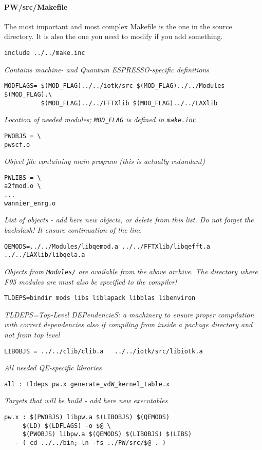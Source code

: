 \documentclass[12pt,a4paper]{article}
\def\qe{{\sc Quantum ESPRESSO}}
\begin{document}
\paragraph{PW/src/Makefile}
The most important and most complex Makefile is the one in the
source directory. It is also the one you need to modify if you
add something.
\begin{verbatim}
include ../../make.inc
\end{verbatim}
{\em Contains machine- and \qe-specific definitions}
\begin{verbatim}
MODFLAGS= $(MOD_FLAG)../../iotk/src $(MOD_FLAG)../../Modules $(MOD_FLAG).\
          $(MOD_FLAG)../../FFTXlib $(MOD_FLAG)../../LAXlib
\end{verbatim}
{\em Location of needed modules; {\rm \texttt{MOD\_FLAG}} is defined in
\texttt{make.inc}}
\begin{verbatim}
PWOBJS = \
pwscf.o
\end{verbatim}
{\em Object file containing main program (this is actually redundant)}
\begin{verbatim}
PWLIBS = \
a2fmod.o \
...
wannier_enrg.o
\end{verbatim}
{\em List of objects - add here new objects, or delete from this list. Do not
forget the backslash! It ensure continuation of the line}
\begin{verbatim}
QEMODS=../../Modules/libqemod.a ../../FFTXlib/libqefft.a ../../LAXlib/libqela.a
\end{verbatim}
{\em Objects from {\rm\texttt{Modules/}} are available from the above archive.
The directory where F95 modules are must also be specified to the compiler!}
\begin{verbatim}
TLDEPS=bindir mods libs liblapack libblas libenviron
\end{verbatim}
{\em TLDEPS=Top-Level DEPendencieS: a machinery to ensure proper
compilation with correct dependencies also if compiling from inside
a package directory and not from top level}
\begin{verbatim}
LIBOBJS = ../../clib/clib.a   ../../iotk/src/libiotk.a
\end{verbatim}
{\em All needed QE-specific libraries}
\begin{verbatim}
all : tldeps pw.x generate_vdW_kernel_table.x
\end{verbatim}
{\em Targets that will be build - add here new executables}
\begin{verbatim}
pw.x : $(PWOBJS) libpw.a $(LIBOBJS) $(QEMODS)
     $(LD) $(LDFLAGS) -o $@ \
     $(PWOBJS) libpw.a $(QEMODS) $(LIBOBJS) $(LIBS)
   - ( cd ../../bin; ln -fs ../PW/src/$@ . )
\end{verbatim}
\end{document}

